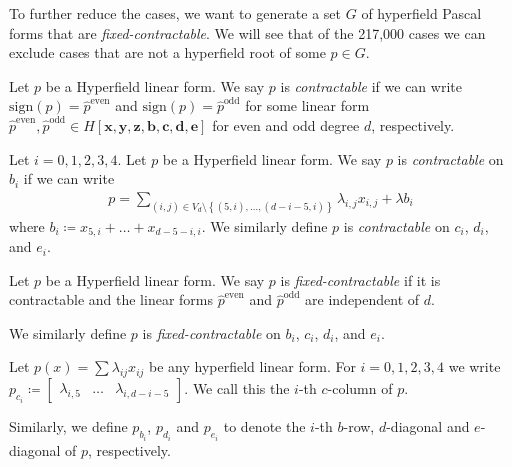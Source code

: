 To further reduce the cases, we want to generate a set \( G \) of hyperfield Pascal forms that are \emph{fixed-contractable}. We will see that of the 217,000 cases we can exclude cases that are not a hyperfield root of some \( p \in G \).

\begin{definition}
    Let \( p \) be a Hyperfield linear form. We say \( p \) is \emph{contractable} if we can write \( \mathrm{sign}(p) = \hat p^{\mathrm{even}} \) and  \( \mathrm{sign}(p) = \hat p^{\mathrm{odd}} \) for some linear form \( \hat p^{\mathrm{even}}, \hat p^{\mathrm{odd}} \in H[\mathbf{x}, \mathbf{y}, \mathbf{z}, \mathbf{b}, \mathbf{c}, \mathbf{d}, \mathbf{e}] \) for even and odd degree \( d \), respectively. 
\end{definition}

\begin{definition}
    Let \( i = 0,1,2,3,4 \).
    Let \( p \) be a Hyperfield linear form. We say \( p \) is \emph{contractable} on \( b_i \) if we can write
    \begin{align*}
        p = \sum_{(i,j) \in V_d \setminus \left\{ (5,i), \dots, (d-i-5, i) \right\}} \lambda_{i,j} x_{i,j}  +\lambda b_i
    \end{align*}
    where \( b_i \coloneqq x_{5,i} + \dots + x_{d-5-i,i} \). We similarly define \( p \) is \emph{contractable} on \( c_i \), \( d_i \), and \( e_i \).
\end{definition}

\begin{definition}
    Let \( p \) be a Hyperfield linear form. We say \( p \) is \emph{fixed-contractable} if it is contractable and the linear forms \( \hat p^{\mathrm{even}} \) and \( \hat p^{\mathrm{odd}} \) are independent of \( d \). 

    We similarly define \( p \) is \emph{fixed-contractable} on \( b_i \), \( c_i \), \( d_i \), and \( e_i \).
\end{definition}

\begin{definition}
    Let $p(x) = \sum \lambda_{ij} x_{ij}$ be any hyperfield linear form. For $i = 0,1,2,3,4$ we write \( p_{c_{i}} \coloneqq \begin{bmatrix} \lambda_{i, 5} & \dots & \lambda_{i,d-i-5} \end{bmatrix} \).
  We call this the $i$-th $c$-column of $p$.
  
   Similarly, we define $p_{b_{i}}$, $p_{d_{i}}$ and $p_{e_{i}}$ to denote the $i$-th $b$-row, $d$-diagonal and $e$-diagonal of $p$, respectively.
  \end{definition}


